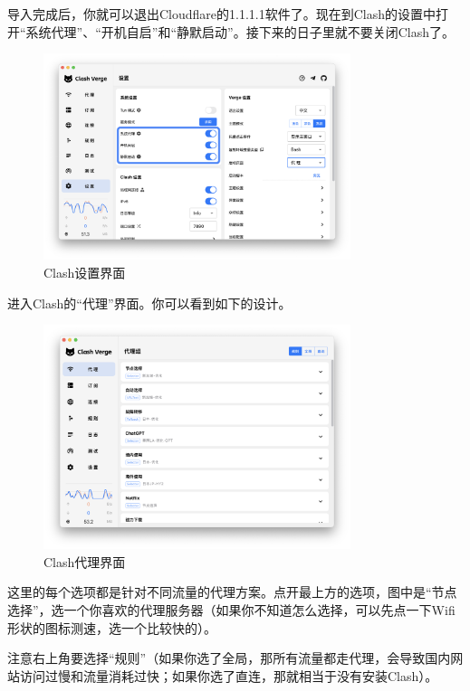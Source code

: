 导入完成后，你就可以退出\textsf{Cloudflare}的\textsf{1.1.1.1}软件了。现在到\textsf{Clash}的设置中打开“系统代理”、“开机自启”和“静默启动”。接下来的日子里就不要关闭\textsf{Clash}了。
\begin{figure}[H]
    \centering
    \includegraphics[width=0.8\textwidth]{pics/clash-settings.png}
    \caption{\textsf{Clash}设置界面}
\end{figure}

进入\textsf{Clash}的“代理”界面。你可以看到如下的设计。

\begin{figure}[H]
    \centering
    \includegraphics[width=0.8\textwidth]{pics/clash-proxy.png}
    \caption{\textsf{Clash}代理界面}
\end{figure}

这里的每个选项都是针对不同流量的代理方案。点开最上方的选项，图中是“节点选择”，选一个你喜欢的代理服务器（如果你不知道怎么选择，可以先点一下Wifi形状的图标测速，选一个比较快的）。

注意右上角要选择“规则”（如果你选了全局，那所有流量都走代理，会导致国内网站访问过慢和流量消耗过快；如果你选了直连，那就相当于没有安装\textsf{Clash}）。

